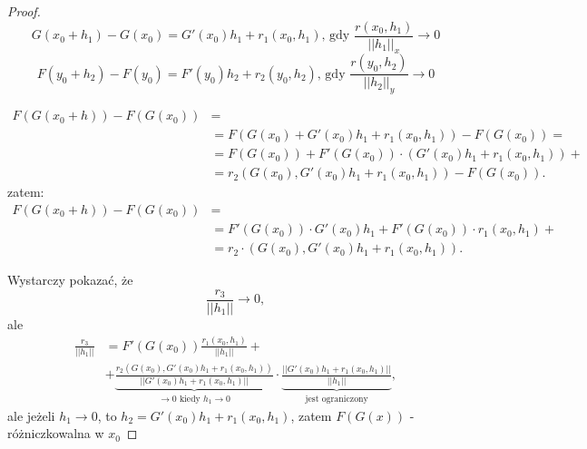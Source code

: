\documentclass[../main.tex]{subfiles}
\begin{document}
\begin{proof}
    \[
        G(x_0 + h_1) - G(x_0) = G'(x_0)h_1+r_1(x_0,h_1)\text{, gdy }\frac{r(x_0,h_1)}{||h_1||_x} \to 0
    \]
    \[
        F(y_0 + h_2) - F(y_0) = F'(y_0)h_2+r_2(y_0,h_2)\text{, gdy }\frac{r(y_0,h_2)}{||h_2||_y} \to 0
    \]

\begin{align*}
    F\left(G(x_0 + h)\right) - F(G(x_0)) &=\\
    &= F(G(x_0) + G'(x_0)h_1 + r_1(x_0,h_1)) - F(G(x_0)) =\\
    &= F(G(x_0)) + F'(G(x_0)) \cdot (G'(x_0)h_1 + r_1(x_0,h_1)) + \\
    &= r_2(G(x_0), G'(x_0)h_1 + r_1(x_0,h_1)) - F(G(x_0)).
\end{align*}
zatem:
\begin{align*}
    F(G(x_0+h)) - F(G(x_0)) &=\\
    &=F'(G(x_0)) \cdot G'(x_0)h_1+F'(G(x_0)) \cdot r_1(x_0,h_1)+\\
    &=r_2 \cdot (G(x_0),G'(x_0)h_1+r_1(x_0,h_1))
.\end{align*}

Wystarczy pokazać, że
    \[
        \frac{r_3}{||h_1||}\to 0,
    \]
    ale
    \begin{align*}
        \frac{r_3}{||h_1||} &= F'(G(x_0)) \frac{r_1(x_0,h_1)}{||h_1||} +\\
        &+ \underbrace{\frac{r_2(G(x_0),G'(x_0)h_1+r_1(x_0,h_1))}{||G'(x_0)h_1 + r_1(x_0,h_1)||}}_{\to 0 \text{ kiedy } h_1 \to 0} \cdot
        \underbrace{\frac{||G'(x_0)h_1+r_1(x_0,h_1)||}{||h_1||}}_{\text{jest ograniczony}}
    ,\end{align*}
    ale jeżeli $h_1\to 0$, to $h_2 = G'(x_0)h_1+r_1(x_0,h_1)$,
    zatem $F(G(x))$ - różniczkowalna w $x_0$
\end{proof}
\end{document}
